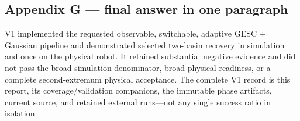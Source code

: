 \documentclass[
  10pt,
  letterpaper,
]{article}
\begin{document}
\subsection{Appendix G --- final answer in one paragraph}\label{appendix-g-final-answer-in-one-paragraph}

V1 implemented the requested observable, switchable, adaptive GESC + Gaussian
pipeline and demonstrated selected two-basin recovery in simulation and once
on the physical robot. It retained substantial negative evidence and did not
pass the broad simulation denominator, broad physical readiness, or a complete
second-extremum physical acceptance. The complete V1 record is this report,
its coverage/validation companions, the immutable phase artifacts, current
source, and retained external runs---not any single success ratio in isolation.
\end{document}
